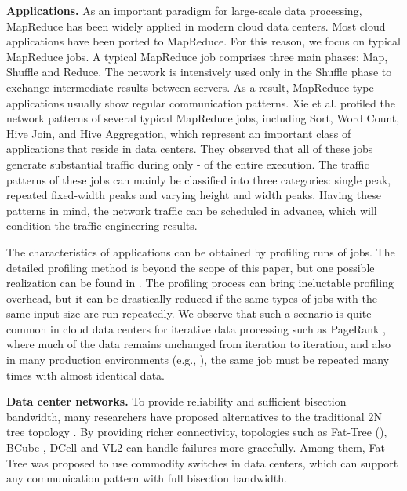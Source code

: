 \documentclass[journal,single-space,two column,twoside,10pt]{IEEEtran}
\begin{document}
\textbf{Applications.} As an important paradigm for large-scale data processing, MapReduce \cite{Dean_Chemawat-2008} has been widely applied in modern cloud data centers.
Most cloud applications have been ported to MapReduce. For this reason, we focus on typical MapReduce jobs. A typical MapReduce job comprises three main phases: Map, Shuffle and Reduce. The network is intensively used only in the Shuffle phase to exchange intermediate results between servers. As a result, MapReduce-type applications usually show regular communication patterns. Xie et al. \cite{Xie_Ding-2012} profiled the network patterns of several typical MapReduce jobs, including Sort, Word Count, Hive Join, and Hive Aggregation, which represent an important class of applications that reside in data centers. They observed that all of these jobs generate substantial traffic during only - of the entire execution. The traffic patterns of these jobs can mainly be classified into three categories: single peak, repeated fixed-width peaks and varying height and width peaks. Having these patterns in mind, the network traffic can be scheduled in advance, which will condition the traffic engineering results.

The characteristics of applications can be obtained by profiling runs of jobs. The detailed profiling method is beyond the scope of this paper, but one possible realization can be found in \cite{Xie_Ding-2012}. The profiling process can bring ineluctable profiling overhead, but it can be drastically reduced if the same types of jobs with the same input size are run repeatedly. We observe that such a scenario is quite common in cloud data centers for iterative data processing such as PageRank \cite{Page_Brin-1999}, where much of the data remains unchanged from iteration to iteration, and also in many production environments (e.g., \cite{Agarwal_Kandula-2012}), the same job must be repeated many times with almost identical data.

\textbf{Data center networks.} To provide reliability and sufficient bisection bandwidth, many researchers have proposed alternatives to the traditional 2N tree topology \cite{Cisco}. By providing richer connectivity, topologies such as Fat-Tree (\cite{Al-Fares_Loukissas-2008, Niranjan_Pamboris-2009}), BCube \cite{Guo_Lu-2009}, DCell \cite{Guo_Wu-2008} and VL2 \cite{Greenberg_Hamilton-2009} can handle failures more gracefully. Among them, Fat-Tree was proposed to use commodity switches in data centers, which can support any communication pattern with full bisection bandwidth.
\end{document}
